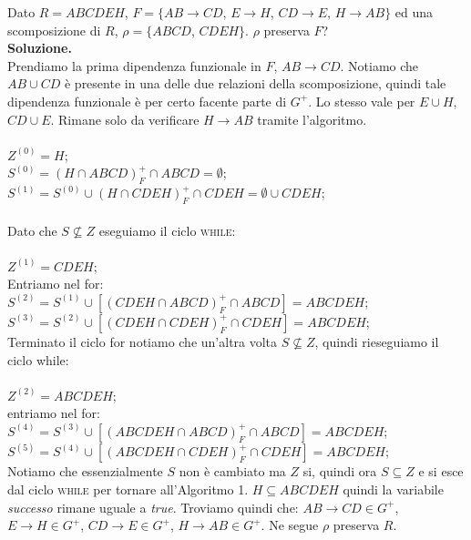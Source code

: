 \begin{exmp}
Dato $R=ABCDEH$, $F=\{AB\rightarrow CD$, $E \rightarrow H$, $CD\rightarrow E$, $H\rightarrow AB\}$ ed una scomposizione
di $R$, $\rho=\{ABCD$, $CDEH\}$. $\rho$ preserva $F$?\\

\noindent \textbf{Soluzione.}\\
Prendiamo la prima dipendenza funzionale in $F$, $AB\rightarrow CD$. Notiamo che $AB \cup CD$ è presente in una delle due
relazioni della scomposizione, quindi tale dipendenza funzionale è per certo facente parte di $G^+$. Lo stesso vale per
$E\cup H$, $CD\cup E$. Rimane solo da verificare $H\rightarrow AB$ tramite l'algoritmo.\\\\
$Z^{(0)}= H$;\\
$S^{(0)} = (H \cap ABCD)^+_F \cap ABCD = \emptyset$;\\
$S^{(1)} = S^{(0)} \cup (H \cap CDEH)^+_F \cap CDEH = \emptyset \cup CDEH$;\\\\
Dato che $S\not\subseteq Z$ eseguiamo il ciclo \textsc{while}:\\\\
$Z^{(1)}= CDEH$;\\
Entriamo nel for:\\
\indent $S^{(2)} = S^{(1)} \cup [(CDEH \cap ABCD)^+_F \cap ABCD] = ABCDEH$;\\
\indent $S^{(3)} = S^{(2)} \cup [(CDEH \cap CDEH)^+_F \cap CDEH] = ABCDEH$;\\

\noindent Terminato il ciclo for notiamo che un'altra volta $S\not\subseteq Z$, quindi rieseguiamo il ciclo while:\\\\
$Z^{(2)}= ABCDEH$;\\
entriamo nel for:\\
\indent $S^{(4)} = S^{(3)} \cup [(ABCDEH \cap ABCD)^+_F \cap ABCD] = ABCDEH$;\\
\indent $S^{(5)} = S^{(4)} \cup [(ABCDEH \cap CDEH)^+_F \cap CDEH] = ABCDEH$;\\

\noindent Notiamo che essenzialmente $S$ non è cambiato ma $Z$ si, quindi ora $S \subseteq Z$ e si 
esce dal ciclo \textsc{while} per tornare all'Algoritmo 1. $H \subseteq ABCDEH$ 
quindi la variabile \emph{successo} rimane uguale a \emph{true}. Troviamo quindi che: 
$AB\rightarrow CD \in G^+$, $E \rightarrow H  \in G^+$, 
$CD\rightarrow E \in G^+$, $H\rightarrow AB  \in G^+$. Ne segue $\rho$ preserva $R$.
\end{exmp}

